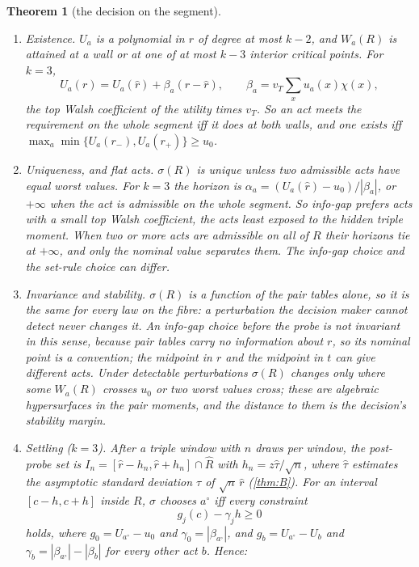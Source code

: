 \documentclass[11pt]{article}
\newtheorem{theorem}{Theorem}\renewcommand{\thetheorem}{\Alph{theorem}}
\theoremstyle{definition}\newtheorem{definition}{Definition}\newtheorem{remark}{Remark}
\begin{document}
\begin{theorem}[the decision on the segment]\label{thm:D}
\begin{enumerate}
\item[(1)] \emph{Existence.} $U_a$ is a polynomial in $r$ of degree at most $k-2$, and $W_a(R)$ is attained at a wall or at one of at
most $k-3$ interior critical points. For $k=3$,
\[U_a(r)=U_a(\hat r)+\beta_a(r-\hat r),\qquad \beta_a=v_T\sum_xu_a(x)\chi(x),\]
the top Walsh coefficient of the utility times $v_T$. So an act meets the requirement on the whole segment iff it does at both walls, and
one exists iff $\max_a\min\{U_a(r_-),U_a(r_+)\}\ge u_0$.
\item[(2)] \emph{Uniqueness, and flat acts.} $\sigma(R)$ is unique unless two admissible acts have equal worst values. For $k=3$ the
horizon is $\alpha_a=(U_a(\hat r)-u_0)/|\beta_a|$, or $+\infty$ when the act is admissible on the whole segment. So info-gap prefers acts
with a small top Walsh coefficient, the acts least exposed to the hidden triple moment. When two or more acts are admissible on all of
$R$ their horizons tie at $+\infty$, and only the nominal value separates them. The info-gap choice and the set-rule choice can differ.
\item[(3)] \emph{Invariance and stability.} $\sigma(R)$ is a function of the pair tables alone, so it is the same for every law on the
fibre: a perturbation the decision maker cannot detect never changes it. An info-gap choice before the probe is not invariant in this
sense, because pair tables carry no information about $r$, so its nominal point is a convention; the midpoint in $r$ and the midpoint in
$t$ can give different acts. Under detectable perturbations $\sigma(R)$ changes only where some $W_a(R)$ crosses $u_0$ or two worst
values cross; these are algebraic hypersurfaces in the pair moments, and the distance to them is the decision's stability margin.
\item[(4)] \emph{Settling} ($k=3$). After a triple window with $n$ draws per window, the post-probe set is
$I_n=[\hat r-h_n,\hat r+h_n]\cap\hat R$ with $h_n=z\hat\tau/\sqrt n$, where $\hat\tau$ estimates the asymptotic standard deviation
$\tau$ of $\sqrt n\,\hat r$ (\cref{thm:B}). For an interval $[c-h,c+h]$ inside $R$, $\sigma$ chooses $a^\circ$ iff every constraint
\[g_j(c)-\gamma_jh\ge0\]
holds, where $g_0=U_{a^\circ}-u_0$ and $\gamma_0=|\beta_{a^\circ}|$, and $g_b=U_{a^\circ}-U_b$ and $\gamma_b=|\beta_{a^\circ}|-|\beta_b|$
for every other act $b$. Hence:
\begin{enumerate}

\end{enumerate}
\end{enumerate}
\end{theorem}
\end{document}
